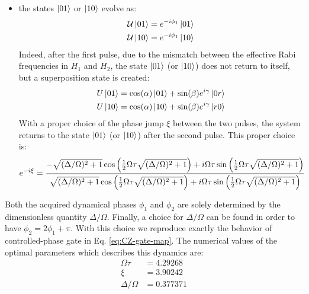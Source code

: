 \documentclass[rmp,10pt,onecolumn,fleqn,notitlepage]{revtex4-1}
\begin{document}
\begin{itemize}
    \item the states $\left\vert{01}\right\rangle$ or $\left\vert{10}\right\rangle$ evolve as:
            \begin{equation}
            \begin{aligned}
                 \mathcal{U} \left\vert{01}\right\rangle &= e^{-i\phi_1} \left\vert{01}\right\rangle \\
                 \mathcal{U} \left\vert{10}\right\rangle &= e^{-i\phi_1} \left\vert{10}\right\rangle
            \end{aligned}
            \end{equation}        
    Indeed, after the first pulse, due to the mismatch between the effective Rabi frequencies in $H_1$ and $H_2$, the state $\left\vert{01}\right\rangle$ (or $\left\vert{10}\right\rangle$) does not return to itself, but a superposition state is created:
            \begin{equation}
            \begin{aligned}
                 U \left\vert{01}\right\rangle &= \cos(\alpha) \left\vert{01}\right\rangle + \sin(\beta) e^{i\gamma} \left\vert{0r}\right\rangle \\
                 U \left\vert{10}\right\rangle &= \cos(\alpha) \left\vert{10}\right\rangle + \sin(\beta) e^{i\gamma} \left\vert{r0}\right\rangle
            \end{aligned}
            \end{equation}      
    With a proper choice of the phase jump $\xi$ between the two pulses, the system returns to the state $\left\vert{01}\right\rangle$ (or $\left\vert{10}\right\rangle$) after the second pulse.
    This proper choice is:
        \begin{equation}
        e^{-i\xi} = \frac{-
        \sqrt{(\Delta/\Omega)^2+1} \cos\qty(\frac{1}{2}\Omega\tau \sqrt{(\Delta/\Omega)^2+1}) + i\Omega\tau\sin\qty(\frac{1}{2}\Omega\tau \sqrt{(\Delta/\Omega)^2+1})
        }{
        \sqrt{(\Delta/\Omega)^2+1} \cos\qty(\frac{1}{2}\Omega\tau \sqrt{(\Delta/\Omega)^2+1}) + i\Omega\tau\sin\qty(\frac{1}{2}\Omega\tau \sqrt{(\Delta/\Omega)^2+1})
        }
        \label{eq:exp_xi}
    \end{equation}
    
\end{itemize}

Both the acquired dynamical phases $\phi_1$ and $\phi_2$ are solely determined by the dimensionless quantity $\Delta/\Omega$. Finally, a choice for $\Delta/\Omega$ can be found in order to have $\phi_2= 2\phi_1 + \pi$.
With this choice we reproduce exactly the behavior of controlled-phase gate in Eq. \eqref{eq:CZ-gate-map}.
The numerical values of the optimal parameters which describes this dynamics are:
\begin{subequations}
    \begin{align}
        \Omega\tau &= 4.29268 \label{eq:opt_val_Ot} \\
        \xi &= 3.90242 \label{eq:opt_val_xi} \\
        \Delta/\Omega &= 0.377371 \label{eq:opt_val_DO}
    \end{align}
    \label{eq:opt_val}
\end{subequations}
\end{document}
